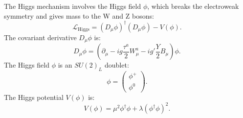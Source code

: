             The Higgs mechanism involves the Higgs field \(\phi\), which breaks the electroweak symmetry and gives mass to the W and Z bosons:
            \[
            \mathcal{L}_{\text{Higgs}} = (D_\mu \phi)^\dagger (D_\mu \phi) - V(\phi).
            \]
            The covariant derivative \(D_\mu \phi\) is:
            \[
            D_\mu \phi = \left( \partial_\mu - i g \frac{\tau^a}{2} W_\mu^a - i g' \frac{Y}{2} B_\mu \right) \phi.
            \]
            The Higgs field \(\phi\) is an \(SU(2)_L\) doublet:
            \[
            \phi = \begin{pmatrix} \phi^+ \\ \phi^0 \end{pmatrix}.
            \]
            The Higgs potential \(V(\phi)\) is:
            \[
            V(\phi) = \mu^2 \phi^\dagger \phi + \lambda (\phi^\dagger \phi)^2.
            \]
